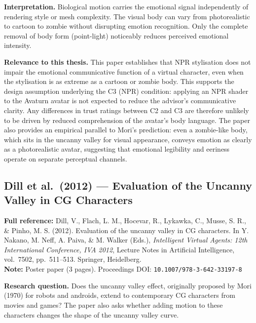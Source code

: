 \documentclass[11pt, a4paper]{article}
\begin{document}
\textbf{Interpretation.} Biological motion carries the emotional signal independently of rendering style or mesh complexity. The visual body can vary from photorealistic to cartoon to zombie without disrupting emotion recognition. Only the complete removal of body form (point-light) noticeably reduces perceived emotional intensity.

\textbf{Relevance to this thesis.} This paper establishes that NPR stylisation does not impair the emotional communicative function of a virtual character, even when the stylisation is as extreme as a cartoon or zombie body. This supports the design assumption underlying the C3 (NPR) condition: applying an NPR shader to the Avaturn avatar is not expected to reduce the advisor's communicative clarity. Any differences in trust ratings between C2 and C3 are therefore unlikely to be driven by reduced comprehension of the avatar's body language. The paper also provides an empirical parallel to Mori's prediction: even a zombie-like body, which sits in the uncanny valley for visual appearance, conveys emotion as clearly as a photorealistic avatar, suggesting that emotional legibility and eeriness operate on separate perceptual channels.

\vspace{8pt}
\subsection{Dill et al.\ (2012) --- Evaluation of the Uncanny Valley in CG Characters}

\begin{refbox}
\textbf{Full reference:} Dill, V., Flach, L. M., Hocevar, R., Lykawka, C., Musse, S. R., \& Pinho, M. S. (2012). Evaluation of the uncanny valley in CG characters. In Y. Nakano, M. Neff, A. Paiva, \& M. Walker (Eds.), \textit{Intelligent Virtual Agents: 12th International Conference, IVA 2012}, Lecture Notes in Artificial Intelligence, vol.\ 7502, pp.\ 511--513. Springer, Heidelberg.\\[4pt]
\textbf{Note:} Poster paper (3 pages). Proceedings DOI: \texttt{10.1007/978-3-642-33197-8}
\end{refbox}

\textbf{Research question.} Does the uncanny valley effect, originally proposed by Mori (1970) for robots and androids, extend to contemporary CG characters from movies and games? The paper also asks whether adding motion to these characters changes the shape of the uncanny valley curve.
\end{document}
